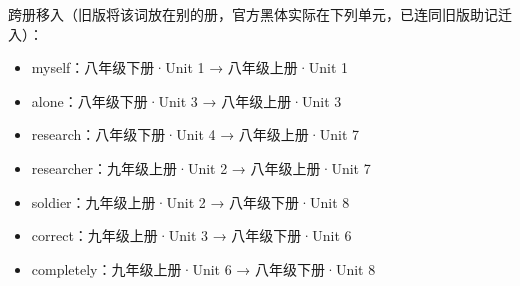 \documentclass[UTF8,a4paper,11pt,oneside]{ctexbook}
\begin{document}
跨册移入（旧版将该词放在别的册，官方黑体实际在下列单元，已连同旧版助记迁入）：\par
\begin{itemize}[leftmargin=2.2em,itemsep=0.25ex,topsep=0.3ex,label={\textcolor{mainblue}{\small\textbullet}}]
\item myself：八年级下册·Unit 1 → 八年级上册·Unit 1
\item alone：八年级下册·Unit 3 → 八年级上册·Unit 3
\item research：八年级下册·Unit 4 → 八年级上册·Unit 7
\item researcher：九年级上册·Unit 2 → 八年级上册·Unit 7
\item soldier：九年级上册·Unit 2 → 八年级下册·Unit 8
\item correct：九年级上册·Unit 3 → 八年级下册·Unit 6
\item completely：九年级上册·Unit 6 → 八年级下册·Unit 8
\end{itemize}
\par\addvspace{0.75em}\par
\vspace{0.12em}\noindent{\color{rulelight}\rule{\linewidth}{0.55pt}}\par
\addvspace{0.2em}
\par\addvspace{0.75em}\par
\vspace{0.12em}\noindent{\color{rulelight}\rule{\linewidth}{0.55pt}}\par
\addvspace{0.2em}
\end{document}
